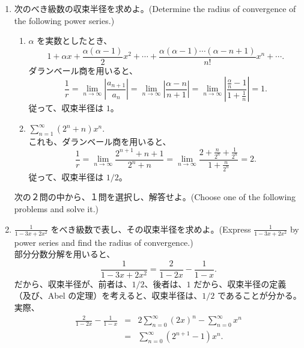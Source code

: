\begin{enumerate}
\item 次のべき級数の収束半径を求めよ。(Determine the radius of convergence of the following power series.)
     \begin{enumerate}
     \item $\alpha$ を実数としたとき、
$$1 + \alpha x + \frac{\alpha(\alpha-1)}{2}x^2 + \cdots + \frac{\alpha(\alpha-1)\cdots(\alpha - n + 1)}{n!}x^n + \cdots. $$
	\sol
	ダランベール商を用いると、
	$$\frac1r = \lim_{n\to\infty}\left|\frac{a_{n+1}}{a_{n}}\right| = \lim_{n\to\infty}\left|\frac{\alpha - n}{n+1}\right| = \lim_{n\to\infty}\left|\frac{\frac{\alpha}n - 1}{1+\frac1n}\right| =1.$$
	従って、収束半径は $1$。
     \item $\displaystyle{\sum_{n=1}^{\infty}(2^n + n)x^n}.$\\
     \sol
     これも、ダランベール商を用いると、
     $$\frac1r = \lim_{n\to\infty}\frac{2^{n+1} + n + 1}{2^n + n} = 
     \lim_{n\to\infty}\frac{2 + \frac{n}{2^n} + \frac{1}{2^n}}{1 + \frac{n}{2^n}} = 2.$$
     従って、収束半径は $1/2$。
     \end{enumerate}

\vspace{3ex}
\noindent
次の２問の中から、１問を選択し、解答せよ。(Choose one of the following problems and solve it.)
     
\item ${\displaystyle \frac{1}{1-3x + 2x^2}}$ をべき級数で表し、その収束半径を求めよ。(Express ${\displaystyle \frac{1}{1-3x + 2x^2}}$ by power series and find the radius of convergence.)\\
\sol
部分分数分解を用いると、
$$\frac{1}{1-3x + 2x^2} = \frac{2}{1 - 2x} - \frac{1}{1-x}.$$
だから、収束半径が、前者は、$1/2$、後者は、$1$ だから、収束半径の定義（及び、Abel の定理）を考えると、収束半径は、$1/2$ であることが分かる。実際、
\begin{eqnarray*}
\frac{2}{1 - 2x} - \frac{1}{1-x} & = & 2\sum_{n=0}^\infty (2x)^n - \sum_{n=0}^\infty x^n\\
& = & \sum_{n=0}^\infty (2^{n+1} - 1)x^n.
\end{eqnarray*}


\end{enumerate}
